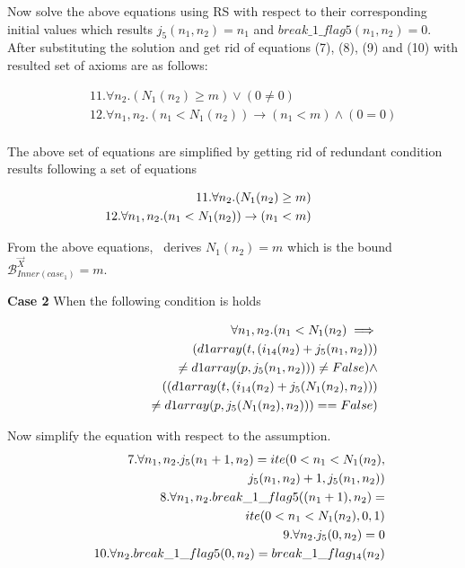 Now solve the above equations using RS  with respect to their corresponding initial values which results $j_5(n_1,n_2)=n_1$ and $break\_1\_flag5(n_1,n_2)=0$. After substituting the solution and get rid of equations (7), (8), (9) and (10) with resulted set of axioms are as follows:

\begin{eqnarray*}
	&&11.\forall n_2.(N_1(n_2)\geq m) \lor (0\not=0) \\
	&&12.\forall n_1,n_2.(n_1<N_1(n_2)) \rightarrow (n_1<m) \land (0=0)\\
\end{eqnarray*}

The above set of equations are simplified by getting rid of redundant condition results following a set of equations

\begin{eqnarray*}
	&&\hspace*{-5em}11.\forall n_2.(N_1(n_2)\geq m)  \\
	&&\hspace*{-5em}12.\forall n_1,n_2.(n_1<N_1(n_2)) \rightarrow (n_1<m)\\
\end{eqnarray*}

From the above equations, \SystemName\ derives $N_1(n_2)=m$ which is the bound $\mathcal{B}^{\vec{X}}_{Inner(case_1)}=m$. 

\textbf{Case 2} When the following condition is holds 

\begin{eqnarray*}
	&&\hspace*{-2em}\forall n_1,n_2.(n_1<N_1(n_2) \implies\\ &&\hspace*{1em}(d1array(t,(i_{14}(n_2)+j_5(n_1,n_2)))\\ &&\hspace*{2em}\not=d1array(p,j_{5}(n_1,n_2)))\not= False)\land \\
	&&\hspace*{3em}((d1array(t,(i_{14}(n_2)+j_5(N_1(n_2),n_2)))\\ &&\hspace*{4em}\not=d1array(p,j_{5}(N_1(n_2),n_2)))== False)
\end{eqnarray*}

Now simplify the equation with respect to the assumption.
\begin{eqnarray*}
	&&7.\forall n_1,n_2.j_5(n_1+1,n_2) = ite(0<n_1< N_1(n_2),\\
	&&\hspace*{8em}j_5(n_1,n_2)+1,j_5(n_1,n_2))\\ 
	&&8.\forall n_1,n_2.break\_1\_flag5((n_1+1),n_2) = \\
	&&\hspace*{8em}ite(0<n_1<N_1(n_2),0,1)\\ 
	&&9.\forall n_2.j_{5}(0,n_2) = 0\\
	&&10.\forall n_2.break\_1\_flag5(0,n_2) = break\_1\_flag_{14}(n_2)
\end{eqnarray*}

